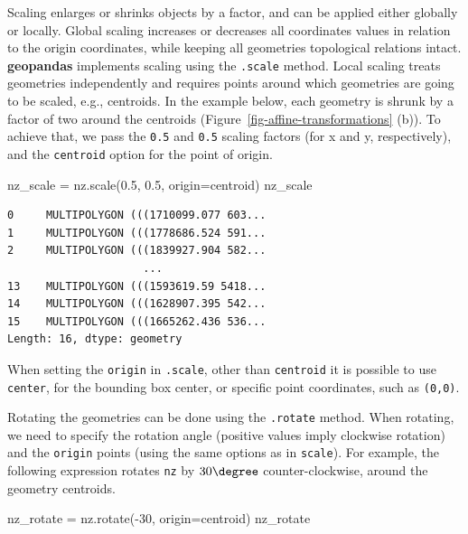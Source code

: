 \documentclass[
  letterpaper,
]{krantz}
\newenvironment{Shaded}{\begin{snugshade}}{\end{snugshade}}
\newcommand{\DecValTok}[1]{\textcolor[rgb]{0.68,0.00,0.00}{#1}}
\newcommand{\FloatTok}[1]{\textcolor[rgb]{0.68,0.00,0.00}{#1}}
\newcommand{\NormalTok}[1]{\textcolor[rgb]{0.00,0.23,0.31}{#1}}
\newcommand{\OperatorTok}[1]{\textcolor[rgb]{0.37,0.37,0.37}{#1}}
\newcommand{\StringTok}[1]{\textcolor[rgb]{0.13,0.47,0.30}{#1}}
\begin{document}
Scaling enlarges or shrinks objects by a factor, and can be applied
either globally or locally. Global scaling increases or decreases all
coordinates values in relation to the origin coordinates, while keeping
all geometries topological relations intact. \textbf{geopandas}
implements scaling using the \texttt{.scale} method. Local scaling
treats geometries independently and requires points around which
geometries are going to be scaled, e.g., centroids. In the example
below, each geometry is shrunk by a factor of two around the centroids
(Figure~\ref{fig-affine-transformations} (b)). To achieve that, we pass
the \texttt{0.5} and \texttt{0.5} scaling factors (for x and y,
respectively), and the
\texttt{\textquotesingle{}centroid\textquotesingle{}} option for the
point of origin.

\begin{Shaded}
\begin{Highlighting}[]
\NormalTok{nz\_scale }\OperatorTok{=}\NormalTok{ nz.scale(}\FloatTok{0.5}\NormalTok{, }\FloatTok{0.5}\NormalTok{, origin}\OperatorTok{=}\StringTok{\textquotesingle{}centroid\textquotesingle{}}\NormalTok{)}
\NormalTok{nz\_scale}
\end{Highlighting}
\end{Shaded}

\begin{verbatim}
0     MULTIPOLYGON (((1710099.077 603...
1     MULTIPOLYGON (((1778686.524 591...
2     MULTIPOLYGON (((1839927.904 582...
                     ...                
13    MULTIPOLYGON (((1593619.59 5418...
14    MULTIPOLYGON (((1628907.395 542...
15    MULTIPOLYGON (((1665262.436 536...
Length: 16, dtype: geometry
\end{verbatim}

When setting the \texttt{origin} in \texttt{.scale}, other than
\texttt{\textquotesingle{}centroid\textquotesingle{}} it is possible to
use \texttt{\textquotesingle{}center\textquotesingle{}}, for the
bounding box center, or specific point coordinates, such as
\texttt{(0,0)}.

Rotating the geometries can be done using the \texttt{.rotate} method.
When rotating, we need to specify the rotation angle (positive values
imply clockwise rotation) and the \texttt{origin} points (using the same
options as in \texttt{scale}). For example, the following expression
rotates \texttt{nz} by \(30\degree\) counter-clockwise, around the
geometry centroids.

\begin{Shaded}
\begin{Highlighting}[]
\NormalTok{nz\_rotate }\OperatorTok{=}\NormalTok{ nz.rotate(}\OperatorTok{{-}}\DecValTok{30}\NormalTok{, origin}\OperatorTok{=}\StringTok{\textquotesingle{}centroid\textquotesingle{}}\NormalTok{)}
\NormalTok{nz\_rotate}
\end{Highlighting}
\end{Shaded}
\end{document}
